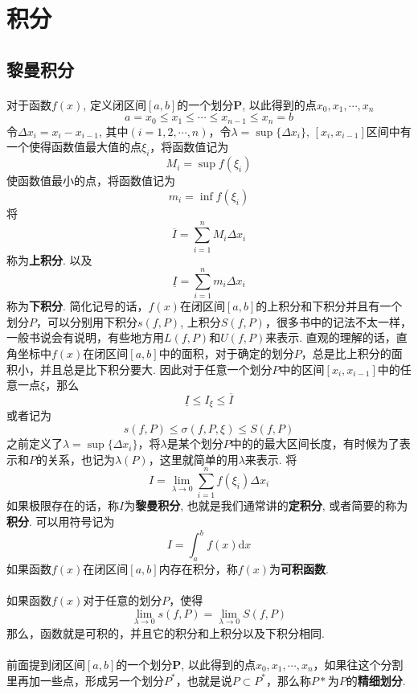 \section{积分}

\subsection{黎曼积分}
\paragraph{}
对于函数$f(x)$, 定义闭区间$[a, b]$的一个划分$\textbf{P}$, 以此得到的点$x_0, x_1, \cdots, x_n$
$$
a = x_0 \leq x_1 \leq \cdots \leq x_{n-1} \leq x_n = b
$$
令$\Delta x_i = x_i - x_{i - 1}$, 其中$(i = 1, 2, \cdots, n)$，令$\lambda = \sup\{ \Delta x_i \}$,  $[x_i, x_{i-1}]$区间中有一个使得函数值最大值的点$\xi_i$，将函数值记为
$$
M_i = \sup f(\xi_i)
$$
使函数值最小的点，将函数值记为
$$
m_i = \inf f(\xi_i)
$$
将
$$
\overline{I} = \sum_{i = 1}^n M_i \Delta x_i
$$
称为\textbf{上积分}. 以及
$$
\underline{I} = \sum_{i = 1}^n m_i \Delta x_i
$$
称为\textbf{下积分}. 简化记号的话，$f(x)$在闭区间$[a, b]$的上积分和下积分并且有一个划分$P$，可以分别用下积分$s(f, P)$, 上积分$S(f, P)$，很多书中的记法不太一样，一般书说会有说明，有些地方用$L(f, P)$和$U(f, P)$来表示. 直观的理解的话，直角坐标中$f(x)$在闭区间$[a, b]$中的面积，对于确定的划分$P$，总是比上积分的面积小，并且总是比下积分要大. 因此对于任意一个划分$P$中的区间$[x_i, x_{i-1}]$中的任意一点$\xi$，那么
$$
\underline{I} \leq   I_\xi  \leq \overline{I}
$$
或者记为
$$
s(f, P) \leq \sigma(f, P, \xi) \leq S(f, P)
$$
之前定义了$\lambda = \sup\{ \Delta x_i \}$，将$\lambda$是某个划分$P$中的的最大区间长度，有时候为了表示和$P$的关系，也记为$\lambda(P)$，这里就简单的用$\lambda$来表示.
将
$$
I = \lim_{\lambda \to 0} \sum_{i = 1}^n f(\xi_i) \Delta x_i
$$
如果极限存在的话，称$I$为\textbf{黎曼积分}, 也就是我们通常讲的\textbf{定积分}, 或者简要的称为\textbf{积分}. 可以用符号记为
$$
I = \int_a^b f(x) \mathrm{d}x
$$
如果函数$f(x)$在闭区间$[a, b]$内存在积分，称$f(x)$为\textbf{可积函数}.

\paragraph{}
如果函数$f(x)$对于任意的划分$P$，使得
$$
\lim_{\lambda \to 0} s(f, P) = \lim_{\lambda \to 0} S(f, P)
$$
那么，函数就是可积的，并且它的积分和上积分以及下积分相同. 

\paragraph{}
前面提到闭区间$[a, b]$的一个划分$\textbf{P}$, 以此得到的点$x_0, x_1, \cdots, x_n$，如果往这个分割里再加一些点，形成另一个划分$P^*$，也就是说$P \subset P^*$，那么称$P*$为$P$的\textbf{精细划分}.

